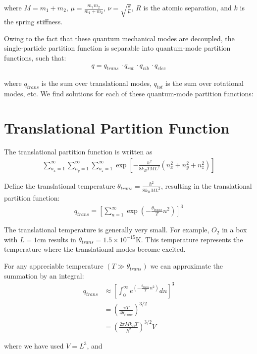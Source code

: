 \documentclass[book.tex]{subfiles}
\begin{document}
\noindent where $M=m_1+m_2$, $\mu=\frac{m_1 m_2}{m_1 + m_2}$, $\nu = \sqrt{\frac{k}{\mu}}$, $R$ is the atomic separation, and $k$ is the spring stiffness.

Owing to the fact that these quantum mechanical modes are decoupled, the single-particle partition function is separable into quantum-mode partition functions, such that:
\begin{align} \label{part_idealGas}
q = q_{trans} \, \cdot q_{rot} \, \cdot q_{vib} \, \cdot q_{elec}
\end{align}

\noindent where $q_{trans}$ is the sum over translational modes, $q_{tot}$ is the sum over rotational modes, etc. We find solutions for each of these quantum-mode partition functions:
\section{Translational Partition Function}

The translational partition function is written as
\begin{align}
\sum_{n_x=1}^\infty\sum_{n_y=1}^\infty\sum_{n_z=1}^\infty\exp\left[-\frac{h^2}{8k_BTML^2}\left(n_x^2+n_y^2+n_z^2\right)\right]
\end{align}

Define the translational temperature $\theta_{trans} = \frac{h^2}{8k_BML^2}$, resulting in the translational partition function:
\begin{align}\label{part_trans}
q_{trans} = \left[\sum_{n=1}^\infty \exp \left(-\frac{\theta_{trans}}{T}n^2\right)\right]^3
\end{align}

The translational temperature is generally very small. For example, $O_2$ in a box with $L = 1\textrm{cm}$ results in $\theta_{trans}= 1.5\times10^{-15}\textrm{K}$. This temperature represents the temperature where the translational modes become excited.

For any appreciable temperature $(T\gg\theta_{trans})$ we can approximate the summation by an integral:
\begin{align}\label{part_trans_simple}
q_{trans} &\approx \left[\int_0^\infty  e^{\left(-\frac{\theta_{trans}}{T}n^2\right)}dn\right]^3  \\ 
&= \left(\frac{\pi T}{4\theta_{trans}}\right)^{3/2} \\
&= \left(\frac{2\pi Mk_BT}{h^2}\right)^{3/2} V 
\end{align}

\noindent where we have used $V=L^3$, and 
\end{document}
